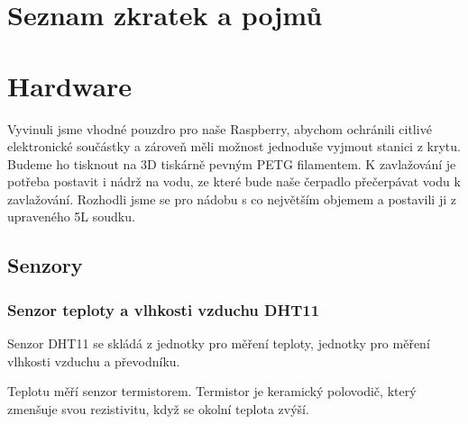 \documentclass[12pt,a4paper]{article}
\begin{document}
\section{Seznam zkratek a pojmů}
\begin{acronym}
\end{acronym}

\clearpage

\section{Hardware}

Vyvinuli jsme vhodné pouzdro pro naše Raspberry, abychom ochránili citlivé elektronické součástky a zároveň měli možnost jednoduše vyjmout stanici z krytu. Budeme ho tisknout na 3D tiskárně pevným \ac{PETG} filamentem. K zavlažování je potřeba postavit i nádrž na vodu, ze které bude naše čerpadlo přečerpávat vodu k zavlažování. Rozhodli jsme se pro nádobu s co největším objemem a postavili ji z upraveného 5L soudku.

\subsection{Senzory}

\subsubsection{Senzor teploty a vlhkosti vzduchu DHT11}

Senzor \ac{DHT11} se skládá z jednotky pro měření teploty, jednotky pro měření vlhkosti vzduchu a převodníku.

Teplotu měří senzor termistorem. Termistor je keramický polovodič, který zmenšuje svou rezistivitu, když se okolní teplota zvýší.
\end{document}
